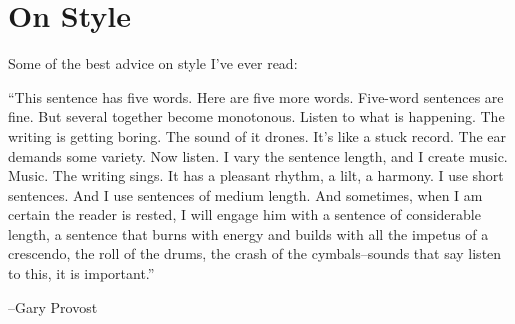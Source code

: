 
\chapter{On Style} 

Some of the best advice on style I've ever read:

“This sentence has five words. Here are five more words. Five-word sentences are fine. But several together become monotonous. Listen to what is happening. The writing is getting boring. The sound of it drones. It’s like a stuck record. The ear demands some variety. Now listen. I vary the sentence length, and I create music. Music. The writing sings. It has a pleasant rhythm, a lilt, a harmony. I use short sentences. And I use sentences of medium length. And sometimes, when I am certain the reader is rested, I will engage him with a sentence of considerable length, a sentence that burns with energy and builds with all the impetus of a crescendo, the roll of the drums, the crash of the cymbals–sounds that say listen to this, it is important.”

--Gary Provost